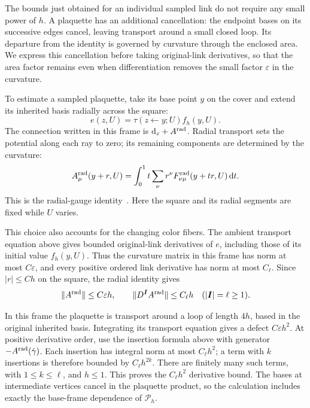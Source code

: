 \documentclass[11pt,a4paper]{article}
\theoremstyle{remark}
\newcommand{\dd}{\mathrm d}
\newcommand{\eps}{\varepsilon}
\begin{document}
The bounds just obtained for an individual sampled link do not require
any small power of $h$. A plaquette has an additional cancellation:
the endpoint bases on its successive edges cancel, leaving transport
around a small closed loop. Its departure from the identity is governed
by curvature through the enclosed area. We express this cancellation
before taking original-link derivatives, so that the area factor remains
even when differentiation removes the small factor $\eps$ in the
curvature.

To estimate a sampled plaquette, take its base point $y$ on the cover
and extend its inherited basis radially across the square:
\begin{equation}
 e(z,U)=\tau(z\leftarrow y;U)f_h(y,U).
\end{equation}
The connection written in this frame is $\dd_z+A^{\rm rad}$.
Radial transport sets the potential along each ray to zero; its
remaining components are determined by the curvature:
\begin{equation}
 A_\mu^{\rm rad}(y+r,U)
 =\int_0^1 t\sum_\nu r^\nu
 F_{\nu\mu}^{\rm rad}(y+tr,U)\,\dd t .
 \label{app:g:radial-identity}
\end{equation}
This is the radial-gauge identity~\cite[eq.~(1.2)]{LeupoldWeigert}.
Here the square and its radial segments are fixed while $U$ varies.

This choice also accounts for the changing color fibers. The ambient
transport equation above gives bounded original-link derivatives of
$e$, including those of its initial value $f_h(y,U)$. Thus the
curvature matrix in this frame has norm at most $C\eps$, and every
positive ordered link derivative has norm at most $C_\ell$.
Since $|r|\le Ch$ on the square, the radial identity gives
\begin{equation}
 \|A^{\rm rad}\|\le C\eps h,\qquad
 \|D^{\boldsymbol I}A^{\rm rad}\|\le C_\ell h
 \quad(|\boldsymbol I|=\ell\ge1).
\end{equation}

In this frame the plaquette is transport around a loop of length $4h$,
based in the original inherited basis. Integrating its transport
equation gives a defect $C\eps h^2$. At positive derivative order,
use the insertion formula above with generator
$-A^{\rm rad}(\dot\gamma)$. Each insertion has integral norm at most
$C_\ell h^2$; a term with $k$ insertions is therefore bounded by
$C_\ell h^{2k}$. There are finitely many such terms, with
$1\le k\le\ell$, and $h\le1$. This proves the $C_\ell h^2$
derivative bound. The bases at intermediate vertices cancel in the
plaquette product, so the calculation includes exactly the base-frame
dependence of $\mathcal P_h$.
\end{document}
